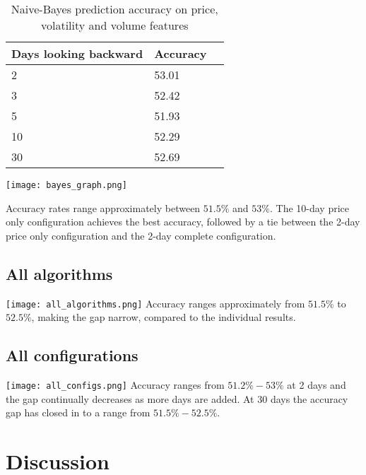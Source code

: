 \documentclass{article}
\begin{document}
\begin{table}[!h]
\begin{center}
    \begin{tabular}{ | l | l | p{3cm} |}
    \hline
    Days looking backward & Accuracy \\ \hline
    2 & 53.01  \\ \hline
    3 & 52.42  \\ \hline
    5 & 51.93  \\ \hline
    10 & 52.29  \\ \hline
    30 & 52.69 \\ 
    \hline
    \end{tabular}
\caption{Naive-Bayes prediction accuracy on price, volatility and volume features}
\end{center}
\end{table}

\texttt{[image: bayes\_graph.png]}

Accuracy rates range approximately between $51.5\%$ and $53\%$. The 10-day price only configuration achieves the best accuracy, followed by a tie between the 2-day price only configuration and the 2-day complete configuration.

\subsection{All algorithms}

\texttt{[image: all\_algorithms.png]}
Accuracy ranges approximately from $51.5\%$ to $52.5\%$, making the gap narrow, compared to the individual results.

\subsection{All configurations}

\texttt{[image: all\_configs.png]}
Accuracy ranges from $51.2\% - 53\%$ at 2 days and the gap continually decreases as more days are added. At 30 days the accuracy gap has closed in to a range from $51.5\% - 52.5\%$.

\newpage

\section{Discussion}
\end{document}
